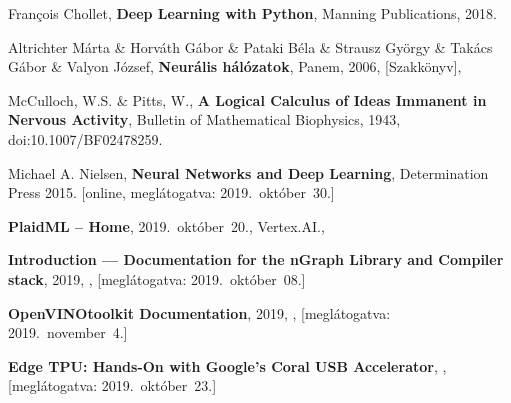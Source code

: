 \begin{thebibliography}{9}
	François Chollet,
	\textbf{Deep Learning with Python},
	Manning Publications,
	2018.

	Altrichter Márta \& Horváth Gábor \& Pataki Béla \& Strausz György \& Takács Gábor \& Valyon József,
	\textbf{Neurális hálózatok},
	Panem,
	2006,
	[Szakkönyv],

	McCulloch, W.S. \& Pitts, W.,
	\textbf{A Logical Calculus of Ideas Immanent in Nervous Activity},
	Bulletin of Mathematical Biophysics,
	1943,
	doi:10.1007/BF02478259.

	Michael A. Nielsen,
	\textbf{Neural Networks and Deep Learning},
	Determination Press
	2015.
	[online, meglátogatva: 2019.~október~30.]
	



	\textbf{PlaidML -- Home},
	2019.~október~20.,
	Vertex.AI.,

	\textbf{Introduction --- Documentation for the {nGraph} Library and Compiler stack},
	2019,
	,
	[meglátogatva: 2019.~október~08.]

	\textbf{OpenVINO\textsuperscript{\texttrademark}\space toolkit Documentation},
	2019,
	,
	[meglátogatva: 2019.~november~4.]


	\textbf{Edge TPU: Hands-On with Google’s Coral USB Accelerator},
	,
	[meglátogatva: 2019.~október~23.]


\end{thebibliography}
